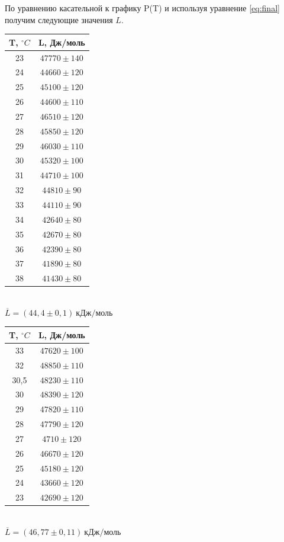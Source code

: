\documentclass[12pt]{article}
\begin{document}
	
	По уравнению касательной к графику P(T) и используя уравнение \ref{eq:final} получим следующие значения $L$.\\
	
	\begin{minipage}{0.45\textwidth}
		\centering
	\begin{tabular}{|c|c|}
		\hline 
		T, $^{\circ} C$ & L, Дж/моль \\ 
		\hline 
		23 & $47770\pm 140$ \\ 
		\hline 
		24 & $44660\pm 120$ \\ 
		\hline 
		25 & $45100\pm 120$ \\ 
		\hline 
		26 & $44600\pm 110$ \\ 
		\hline 
		27 & $46510\pm 120$ \\ 
		\hline 
		28 & $45850\pm 120$ \\ 
		\hline 
		29 & $46030\pm 110$ \\ 
		\hline 
		30 & $45320\pm 100$ \\ 
		\hline 
		31 & $44710\pm 100$ \\ 
		\hline 
		32 & $44810\pm 90$ \\ 
		\hline 
		33 & $44110\pm 90$ \\ 
		\hline 
		34 & $42640\pm 80$ \\ 
		\hline 
		35 & $42670\pm 80$ \\ 
		\hline 
		36 & $42390\pm 80$ \\ 
		\hline 
		37 & $41890\pm 80$ \\ 
		\hline 
		38 & $41430\pm 80$ \\ 
		\hline 
	\end{tabular}\\ 
	$\overline{L} = (44,4\pm 0,1)\ \textit{кДж/моль}$
		\end{minipage}
\hspace{1cm}
\begin{minipage}{0.45\textwidth}
	\centering
	\begin{tabular}{|c|c|}
		\hline 
		T, $^{\circ} C$ & L, Дж/моль \\ 
		\hline 
		33 & $47620\pm 100$  \\ 
		\hline 
		32 & $48850\pm 110$ \\ 
		\hline 
		30,5 & $48230\pm 110$  \\ 
		\hline 
		30 &$48390\pm 120$\\
		\hline
		29 &$47820\pm 110$  \\ 
		\hline 
		28 &$47790\pm 120$  \\ 
		\hline 
		27 &$4710\pm 120$  \\ 
		\hline 
		26 &$46670\pm 120$ \\ 
		\hline 
		25 & $45180\pm 120$\\ 
		\hline 
		24 & $43660\pm 120$ \\ 
		\hline 
		23 & $ 42690\pm 120$\\ 
		\hline 
		\end{tabular}\\ 
			$\overline{L} = (46,77\pm 0,11)\ \textit{кДж/моль}$
\end{minipage}
\end{document}
